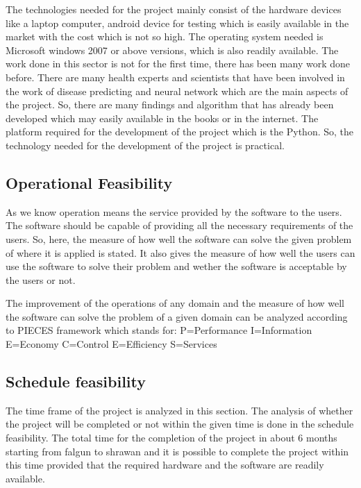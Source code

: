 The technologies needed for the project mainly consist of the hardware devices like a laptop computer, android device for testing which is 
easily available in the market with the cost which is not so high. The operating system needed is Microsoft windows 2007 or above versions,
which is also readily available. The work done in this sector is not for the first time, there has been many work done before. There are many health experts and scientists that have been involved in the work of disease predicting and neural network which are the main aspects of the project. So, there are many findings and algorithm that has already been developed which may easily available in the books or in the internet. The platform required for the development of the project which is the Python. So, the technology needed for the development of the project 
is practical.

\subsection{Operational Feasibility}
As we know operation means the service provided by the software to the users. The software should be capable of providing all the 
necessary requirements of the users. So, here, the measure of how well the software can solve the given problem of where it is applied is 
stated. It also gives the measure of how well the users can use the software to solve their problem and wether the software is acceptable 
by the users or not.\par

The improvement of the operations of any domain and the measure of how well the software can solve the problem of a given domain can 
be analyzed according to PIECES framework which stands for: \newpage
P=Performance \newline
I=Information \newline
E=Economy \newline
C=Control \newline
E=Efficiency \newline
S=Services \newline

\subsection{Schedule feasibility}
The time frame of the project is analyzed in this section. The analysis of whether the project will be completed or not within the given time is done in the schedule feasibility. The total time for the completion of the project in about 6 months starting from falgun to shrawan and it is possible to complete the project within this time provided that the required hardware and the software are readily available.

